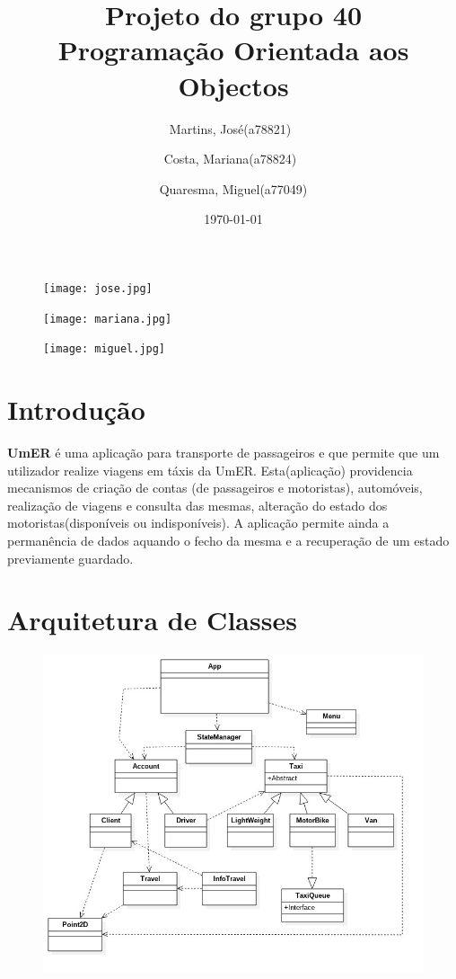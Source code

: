 \documentclass[a4paper,10pt,portuguese]{article}
\title{Projeto do grupo 40 \\ Programação Orientada aos Objectos}
\author{Martins, José(a78821)\
        \and
        Costa, Mariana(a78824)\
        \and
        Quaresma, Miguel(a77049)
        }
\date{\today}
\begin{document}
\begin{titlepage}
\maketitle
\begin{figure}[!htb]
    \texttt{[image: jose.jpg]}
\end{figure}
\begin{figure}[!htb]
    \texttt{[image: mariana.jpg]}
\end{figure}
\begin{figure}[!htb]
    \texttt{[image: miguel.jpg]}
\end{figure}
\end{titlepage}
 
\tableofcontents

\newpage

\section{Introdução}
\textbf{UmER} é uma aplicação para transporte de passageiros e que permite que um utilizador realize viagens em táxis da UmER. Esta(aplicação) providencia mecanismos de criação de contas (de passageiros e motoristas), automóveis, realização de viagens e consulta das mesmas, alteração do estado dos motoristas(disponíveis ou indisponíveis). A aplicação permite ainda a permanência de dados aquando o fecho da mesma e a recuperação de um estado previamente guardado.

\newpage

\section{Arquitetura de Classes}

\begin{figure}[!htb]
    \centering
        \includegraphics[width=120mm]{graph.jpg}
\end{figure}
\end{document}
